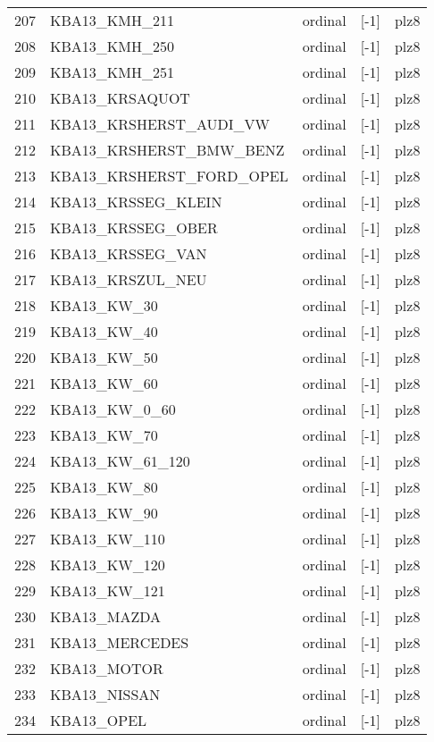 \begin{longtable}{lllll}
207 &    KBA13\_KMH\_211 &  ordinal &   [-1] &  plz8 \\
208 &    KBA13\_KMH\_250 &  ordinal &   [-1] &  plz8 \\
209 &    KBA13\_KMH\_251 &  ordinal &   [-1] &  plz8 \\
210 &   KBA13\_KRSAQUOT &  ordinal &   [-1] &  plz8 \\
211 &   KBA13\_KRSHERST\_AUDI\_VW &  ordinal &   [-1] &  plz8 \\
212 &  KBA13\_KRSHERST\_BMW\_BENZ &  ordinal &   [-1] &  plz8 \\
213 & KBA13\_KRSHERST\_FORD\_OPEL &  ordinal &   [-1] &  plz8 \\
214 &   KBA13\_KRSSEG\_KLEIN &  ordinal &   [-1] &  plz8 \\
215 &    KBA13\_KRSSEG\_OBER &  ordinal &   [-1] &  plz8 \\
216 & KBA13\_KRSSEG\_VAN &  ordinal &   [-1] &  plz8 \\
217 & KBA13\_KRSZUL\_NEU &  ordinal &   [-1] &  plz8 \\
218 &  KBA13\_KW\_30 &  ordinal &   [-1] &  plz8 \\
219 &  KBA13\_KW\_40 &  ordinal &   [-1] &  plz8 \\
220 &  KBA13\_KW\_50 &  ordinal &   [-1] &  plz8 \\
221 &  KBA13\_KW\_60 &  ordinal &   [-1] &  plz8 \\
222 &    KBA13\_KW\_0\_60 &  ordinal &   [-1] &  plz8 \\
223 &  KBA13\_KW\_70 &  ordinal &   [-1] &  plz8 \\
224 &  KBA13\_KW\_61\_120 &  ordinal &   [-1] &  plz8 \\
225 &  KBA13\_KW\_80 &  ordinal &   [-1] &  plz8 \\
226 &  KBA13\_KW\_90 &  ordinal &   [-1] &  plz8 \\
227 &     KBA13\_KW\_110 &  ordinal &   [-1] &  plz8 \\
228 &     KBA13\_KW\_120 &  ordinal &   [-1] &  plz8 \\
229 &     KBA13\_KW\_121 &  ordinal &   [-1] &  plz8 \\
230 &  KBA13\_MAZDA &  ordinal &   [-1] &  plz8 \\
231 &   KBA13\_MERCEDES &  ordinal &   [-1] &  plz8 \\
232 &  KBA13\_MOTOR &  ordinal &   [-1] &  plz8 \\
233 &     KBA13\_NISSAN &  ordinal &   [-1] &  plz8 \\
234 &   KBA13\_OPEL &  ordinal &   [-1] &  plz8 \\

\end{longtable}
